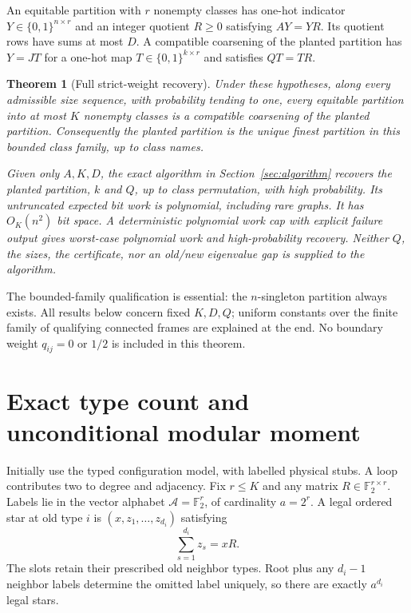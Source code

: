 \documentclass[11pt]{article}
\newtheorem{theorem}{Theorem}
\newcommand{\F}{\mathbb F_2}
\begin{document}
An equitable partition with $r$ nonempty classes has one-hot indicator
$Y\in\{0,1\}^{n\times r}$ and an integer quotient $R\ge0$ satisfying
$AY=YR$. Its quotient rows have sums at most $D$. A compatible
coarsening of the planted partition has $Y=JT$ for a one-hot map
$T\in\{0,1\}^{k\times r}$ and satisfies $QT=TR$.

\begin{theorem}[Full strict-weight recovery]\label{thm:main}
Under these hypotheses, along every admissible size sequence, with
probability tending to one, every equitable partition into at most $K$
nonempty classes is a compatible coarsening of the planted partition.
Consequently the planted partition is the unique finest partition in
this bounded class family, up to class names.

Given only $A,K,D$, the exact algorithm in Section~\ref{sec:algorithm}
recovers the planted partition, $k$ and $Q$, up to class permutation,
with high probability. Its untruncated expected bit work is polynomial,
including rare graphs. It has $O_K(n^2)$ bit space. A deterministic
polynomial work cap with explicit failure output gives worst-case
polynomial work and high-probability recovery.
Neither $Q$, the sizes, the certificate, nor an old/new eigenvalue gap
is supplied to the algorithm.
\end{theorem}

The bounded-family qualification is essential: the $n$-singleton
partition always exists. All results below concern fixed $K,D,Q$;
uniform constants over the finite family of qualifying connected frames
are explained at the end. No boundary weight $q_{ij}=0$ or $1/2$ is
included in this theorem.

\section{Exact type count and unconditional modular moment}
Initially use the typed configuration model, with labelled physical
stubs. A loop contributes two to degree and adjacency. Fix $r\le K$
and any matrix $R\in\F^{r\times r}$. Labels lie in the vector
alphabet $\mathcal A=\F^r$, of cardinality $a=2^r$. A legal ordered
star at old type $i$ is $(x,z_1,\ldots,z_{d_i})$ satisfying
\begin{equation}\label{eq:legal}
 \sum_{s=1}^{d_i}z_s=xR.
\end{equation}
The slots retain their prescribed old neighbor types. Root plus any
$d_i-1$ neighbor labels determine the omitted label uniquely, so there
are exactly $a^{d_i}$ legal stars.
\end{document}
